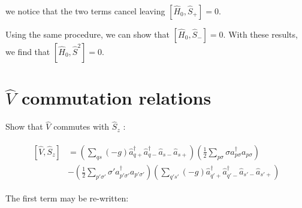 \documentclass[11pt]{article}
\newcommand{\cop}[2]{%
	\ensuremath{ \hat{a} _{#1 #2} ^{\dagger} }}
\newcommand{\aop}[2]{%
	\ensuremath{ \hat{a} _{#1 #2} }}
\newcommand{\sz}[2]{%
	\ensuremath{ \frac{1}{2} \sum_{#1 #2} #2 a _{#1 #2} ^{\dagger} a _{#1 #2} } }
\newcommand{\twobody}[2]{%
	\ensuremath{ \sum_{#1 #2} (-g) \cop{#1}{+} \cop{#1}{-} \aop{#2}{-} \aop{#2}{+}  } }
\newcommand{\sop}[1]{%
	\ensuremath{ \hat{S}_{#1} } }
\newcommand{\hop}{
	\ensuremath{ \hat{H} _0 }}
\newcommand{\ssop}{
	\ensuremath{ \hat{S} ^2} }
\newcommand{\vop}{
	\ensuremath{ \hat{V} } }
\newcommand{\commutator}[2]{%
	\ensuremath{ \left [ #1,#2 \right ] }}
\begin{document}
\noindent we notice that the two terms cancel leaving $ \commutator{\hop}{\sop{+}} =0$.

Using the same procedure, we can show that $ \commutator{\hop}{\sop{-}} = 0$. With these results, we find that $\commutator{\hop}{\ssop} = 0$.

\section*{\vop commutation relations}

Show that \vop commutes with \sop{z}:

\begin{align}
\begin{split}
	\commutator{\vop}{\sop{z}} &= \left ( \twobody{q}{s} \right ) \left ( \sz{p}{\sigma} \right )\\
	& - \left( \sz{p'}{\sigma'} \right ) \left ( \twobody{q'}{s'} \right )
\end{split}
\label{eq:comvsz}
\end{align}

The first term may be re-written:
\end{document}
